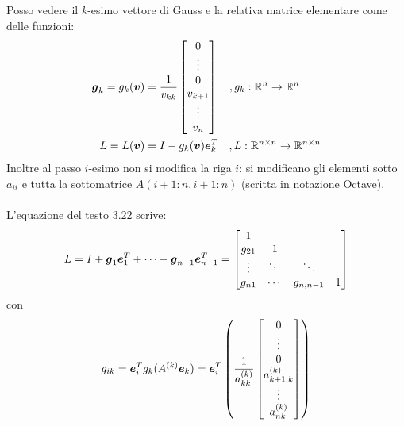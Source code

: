 \begin{oss}
Posso vedere il $k$-esimo vettore di Gauss e la relativa matrice elementare come 
delle funzioni:
\begin{displaymath}
\begin{split}
\boldsymbol{g}_{k} = g_{k}(\boldsymbol{v}) &= \frac{1}{v_{kk}} 
\begin{bmatrix}
0 \\ \vdots \\ 0 \\ v_{k + 1} \\ \vdots \\ v_{n}
\end{bmatrix} \quad , g_{k}: \mathbb{R}^{n} \rightarrow
\mathbb{R}^{n} \\
L = L(\boldsymbol{v}) &= I - g_{k}(\boldsymbol{v})\boldsymbol{e}_{k}^{T}  \quad , L:
\mathbb{R}^{n \times n} \rightarrow \mathbb{R}^{n \times n}
\end{split}
\end{displaymath}
Inoltre al passo $i$-esimo non si modifica la riga $i$: si modificano gli
elementi sotto $a_{ii}$ e tutta la sottomatrice $A(i + 1:n, i + 1:n)$ (scritta
in notazione Octave).
\\\\
L'equazione del testo 3.22 scrive:
\begin{displaymath}
L = I + \boldsymbol{g}_{1}\boldsymbol{e}_{1}^{T} + \cdots + \boldsymbol{g}_{n-1}\boldsymbol{e}_{n-1}^{T}
= \begin{bmatrix}
1 \\
g_{21} & 1 \\
\vdots & \ddots		& \ddots \\
g_{n1} & \cdots		&	g_{n,n-1}	& 1
\end{bmatrix}
\end{displaymath}
con 
\begin{displaymath}
g_{ik} = \boldsymbol{e}_{i}^{T} g_{k}(A^{(k)}\boldsymbol{e}_{k}) = 
\boldsymbol{e}_{i}^{T} \left ( \frac{1}{a_{kk}^{(k)}}
\begin{bmatrix}
0 \\ \vdots \\ 0 \\ a_{k + 1, k}^{(k)} \\ \vdots \\ a_{n k}^{(k)}
\end{bmatrix} \right )
\end{displaymath}
\end{oss}

